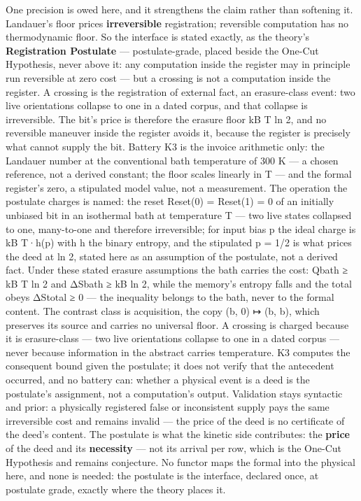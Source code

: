 \documentclass[10pt]{article}
\renewcommand{\_}{\origunderscore\allowbreak}
\begin{document}
One precision is owed here, and it strengthens the claim rather than
softening it. Landauer's floor prices \textbf{irreversible}
registration; reversible computation has no thermodynamic floor. So the
interface is stated exactly, as the theory's \textbf{Registration
Postulate} --- postulate-grade, placed beside the One-Cut Hypothesis,
never above it: any computation inside the register may in principle run
reversible at zero cost --- but a crossing is not a computation inside
the register. A crossing is the registration of external fact, an
erasure-class event: two live orientations collapse to one in a dated
corpus, and that collapse is irreversible. The bit's price is therefore
the erasure floor k\_B T ln 2, and no reversible maneuver inside the
register avoids it, because the register is precisely what cannot supply
the bit. Battery K3 is the invoice arithmetic only: the Landauer number
at the conventional bath temperature of 300 K --- a chosen reference,
not a derived constant; the floor scales linearly in T --- and the
formal register's zero, a stipulated model value, not a measurement. The
operation the postulate charges is named: the reset Reset(0) = Reset(1)
= 0 of an initially unbiased bit in an isothermal bath at temperature T
--- two live states collapsed to one, many-to-one and therefore
irreversible; for input bias p the ideal charge is k\_B T·h(p) with h
the binary entropy, and the stipulated p = 1/2 is what prices the deed
at ln 2, stated here as an assumption of the postulate, not a derived
fact. Under these stated erasure assumptions the bath carries the cost:
Q\_bath ≥ k\_B T ln 2 and ΔS\_bath ≥ k\_B ln 2, while the memory's
entropy falls and the total obeys ΔS\_total ≥ 0 --- the inequality
belongs to the bath, never to the formal content. The contrast class is
acquisition, the copy (b, 0) ↦ (b, b), which preserves its source and
carries no universal floor. A crossing is charged because it is
erasure-class --- two live orientations collapse to one in a dated
corpus --- never because information in the abstract carries
temperature. K3 computes the consequent bound given the postulate; it
does not verify that the antecedent occurred, and no battery can:
whether a physical event is a deed is the postulate's assignment, not a
computation's output. Validation stays syntactic and prior: a physically
registered false or inconsistent supply pays the same irreversible cost
and remains invalid --- the price of the deed is no certificate of the
deed's content. The postulate is what the kinetic side contributes: the
\textbf{price} of the deed and its \textbf{necessity} --- not its
arrival per row, which is the One-Cut Hypothesis and remains conjecture.
No functor maps the formal into the physical here, and none is needed:
the postulate is the interface, declared once, at postulate grade,
exactly where the theory places it.
\end{document}
